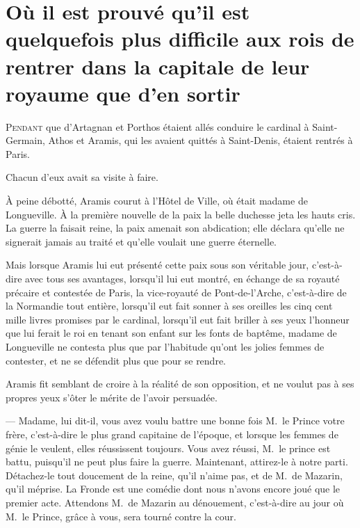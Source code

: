 \chapter[Il est plus difficile aux rois de rentrer dans leur capitale que d'en sortir]{Où il est prouvé qu'il est quelquefois plus difficile aux rois de rentrer dans la capitale de leur royaume que d'en sortir}
	


\lettrine{P}{endant} que d'Artagnan et Porthos étaient allés conduire le cardinal à Saint-Germain, Athos et Aramis, qui les avaient quittés à Saint-Denis, étaient rentrés à Paris.

\zz
Chacun d'eux avait sa visite à faire.

\zz
À peine débotté, Aramis courut à l'Hôtel de Ville, où était madame de Longueville. À la première nouvelle de la paix la belle duchesse jeta les hauts cris. La guerre la faisait reine, la paix amenait son abdication; elle déclara qu'elle ne signerait jamais au traité et qu'elle voulait une guerre éternelle.

Mais lorsque Aramis lui eut présenté cette paix sous son véritable jour, c'est-à-dire avec tous ses avantages, lorsqu'il lui eut montré, en échange de sa royauté précaire et contestée de Paris, la vice-royauté de Pont-de-l'Arche, c'est-à-dire de la Normandie tout entière, lorsqu'il eut fait sonner à ses oreilles les cinq cent mille livres promises par le cardinal, lorsqu'il eut fait briller à ses yeux l'honneur que lui ferait le roi en tenant son enfant sur les fonts de baptême, madame de Longueville ne contesta plus que par l'habitude qu'ont les jolies femmes de contester, et ne se défendit plus que pour se rendre.

Aramis fit semblant de croire à la réalité de son opposition, et ne voulut pas à ses propres yeux s'ôter le mérite de l'avoir persuadée.

— Madame, lui dit-il, vous avez voulu battre une bonne fois M.~le Prince votre frère, c'est-à-dire le plus grand capitaine de l'époque, et lorsque les femmes de génie le veulent, elles réussissent toujours. Vous avez réussi, M.~le prince est battu, puisqu'il ne peut plus faire la guerre. Maintenant, attirez-le à notre parti. Détachez-le tout doucement de la reine, qu'il n'aime pas, et de M.~de Mazarin, qu'il méprise. La Fronde est une comédie dont nous n'avons encore joué que le premier acte. Attendons M.~de Mazarin au dénouement, c'est-à-dire au jour où M.~le Prince, grâce à vous, sera tourné contre la cour.

